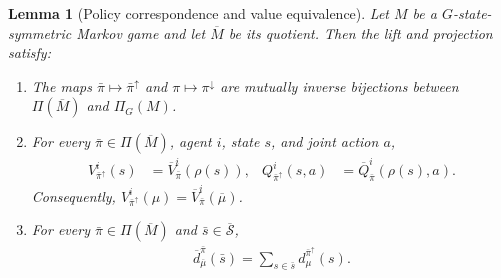 \documentclass{article}
\theoremstyle{plain}
\newtheorem{lemma}[theorem]{Lemma}
\theoremstyle{definition}
\theoremstyle{remark}
\newcommand{\St}{\mathcal{S}}
\newcommand{\quotient}[1]{\overline{#1}}
\newcommand{\Vbar}{\overline{V}}
\newcommand{\Qbar}{\overline{Q}}
\newcommand{\dbar}{\overline{d}}
\begin{document}
\begin{lemma}[Policy correspondence and value equivalence]
\label{lemma:policy-correspondence}
Let $M$ be a $G$-state-symmetric Markov game and let $\quotient M$ be its
quotient. Then the lift and projection satisfy:
\begin{enumerate}[label=(\alph*),leftmargin=2.2em,itemsep=2pt]
  \item \label{item:lift-invariant}
  The maps $\bar\pi\mapsto\bar\pi^\uparrow$ and
  $\pi\mapsto\pi^\downarrow$ are mutually inverse bijections between
  $\Pi(\quotient M)$ and $\Pi_G(M)$.
  \item \label{item:value-equivalence}
  For every $\bar\pi\in\Pi(\quotient M)$, agent $i$, state $s$, and joint action
  $a$,
  \begin{align}
    V^i_{\bar\pi^\uparrow}(s)
    &=
    \Vbar^i_{\bar\pi}(\rho(s)),&
    Q^i_{\bar\pi^\uparrow}(s,a)
    &=
    \Qbar^i_{\bar\pi}(\rho(s),a).
    \label{eq:value-equivalence}
  \end{align}
  Consequently,
  $V^i_{\bar\pi^\uparrow}(\mu)=\Vbar^i_{\bar\pi}(\quotient\mu)$.
  \item \label{item:visitation-equivalence}
  For every $\bar\pi\in\Pi(\quotient M)$ and $\bar s\in\quotient\St$,
  \begin{align}
    \dbar^{\bar\pi}_{\quotient\mu}(\bar s)
    =
    \sum_{s\in\bar s}d^{\bar\pi^\uparrow}_\mu(s).
    \label{eq:visitation-equivalence}
  \end{align}
\end{enumerate}
\end{lemma}
\end{document}
